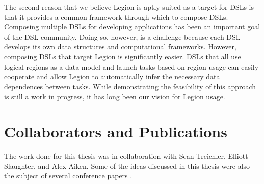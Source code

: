 The second reason that we believe Legion is aptly 
suited as a target for DSLs is that it provides
a common framework through which to compose DSLs.
Composing multiple DSLs for developing applications
has been an important goal of the DSL community. Doing so,
however, is a challenge because each DSL develops
its own data structures and computational frameworks. However,
composing DSLs that target Legion is significantly
easier. DSLs that all use logical regions as a 
data model and launch tasks based on region usage
can easily cooperate and allow Legion to automatically
infer the necessary data dependences between tasks.
While demonstrating the feasibility of this approach
is still a work in progress, it has long been our 
vision for Legion usage.

\section{Collaborators and Publications}
\label{sec:collaborators}

The work done for this thesis was in collaboration with
Sean Treichler, Elliott Slaughter, and Alex Aiken. Some
of the ideas discussed in this thesis were also the subject 
of several conference papers 
\cite{Legion12,Singe14,LegionFields14,Realm14,LegionTypes13}.


